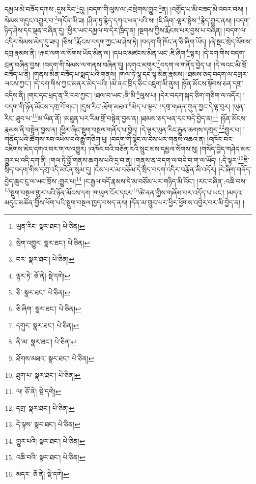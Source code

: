 དམྱལ་མེ་བཟོད་དཀས་:དུས་རིང་\footnote{ཡུན་རིང་  སྣར་ཐང་།  པེ་ཅིན། }དུ། །བདག་གི་ལུས་ལ་:བསྲེགས་གྱུར་\footnote{སྲེག་འགྱུར་  སྣར་ཐང་།  པེ་ཅིན། }ན། །འགྱོད་པ་མི་བཟད་མེ་འབར་བས། །སེམས་གདུང་འགྱུར་བ་\footnote{བར་  སྣར་ཐང་།  པེ་ཅིན། }གདོན་མི་ཟ། །ཤིན་ཏུ་རྙེད་དཀའ་ཕན་པའི་ས། །ཇི་ཞིག་:ལྟར་སྟེས་\footnote{ལྟར་ཏེ་  ཅོ་ནེ།  སྡེ་དགེ། }རྙེད་གྱུར་ནས། །བདག་ཉིད་ཤེས་དང་ལྡན་བཞིན་དུ། །ཕྱིར་ཡང་དམྱལ་བ་དེར་ཁྲིད་ན། །སྔགས་ཀྱིས་རྨོངས་པར་བྱས་པ་བཞིན། །བདག་ལ་འདིར་སེམས་མེད་དུ་ཟད། །ཅིས་\footnote{ཅི་  སྣར་ཐང་།  པེ་ཅིན། }རྨོངས་བདག་ཀྱང་མ་ཤེས་ཏེ། །བདག་གི་ཁོང་ན་ཅི་ཞིག་ཡོད། །ཞེ་སྡང་སྲེད་སོགས་དགྲ་རྣམས་ནི། །རྐང་ལག་ལ་སོགས་ཡོད་མིན་ལ། །དཔའ་མཛངས་མིན་ཡང་:ཇི་ཞིག་\footnote{ཅི་ཞིག་  སྣར་ཐང་།  པེ་ཅིན། }ལྟར། །དེ་དག་གིས་བདག་བྲན་བཞིན་བྱས། །བདག་གི་སེམས་ལ་གནས་བཞིན་དུ། །དགའ་མགུར་\footnote{དགུར་  སྣར་ཐང་།  པེ་ཅིན། }བདག་ལ་གནོད་བྱེད་པ། །དེ་ལའང་མི་ཁྲོ་བཟོད་པ་ནི། །གནས་མིན་བཟོད་པ་སྨད་པའི་གནས། །གལ་ཏེ་ལྷ་དང་ལྷ་མིན་རྣམས། །ཐམས་ཅད་བདག་ལ་དགྲར་ལངས་ཀྱང་། །དེ་དག་གིས་ཀྱང་མནར་མེད་པའི། །མེ་ནང་ཁྲིད་ཅིང་འཇུག་མི་ནུས། །ཉོན་མོངས་སྟོབས་ཅན་དགྲ་འདིས་ནི། །གང་དང་ཕྲད་ན་རི་རབ་ཀྱང་། །ཐལ་བ་ཡང་:ནི་མི་\footnote{ནི་མ་  སྣར་ཐང་།  པེ་ཅིན། }ལུས་པ། །དེར་བདག་སྐད་ཅིག་གཅིག་ལ་འདོར། །བདག་གི་ཉོན་མོངས་དགྲ་བོ་གང་། །དུས་རིང་:ཐོག་མཐའ་\footnote{ཐོགས་མཐའ་  སྣར་ཐང་།  པེ་ཅིན། }མེད་པ་ལྟར། །དགྲ་གཞན་ཀུན་ཀྱང་དེ་ལྟ་བུར། །ཡུན་རིང་:ཐུབ་པ་\footnote{ཐུག་པ་  སྣར་ཐང་།  པེ་ཅིན། }མ་ཡིན་ནོ། །མཐུན་པར་རིམ་གྲོ་བསྟེན་བྱས་ན། །ཐམས་ཅད་ཕན་དང་བདེ་བྱེད་ན།\footnote{ལ།  ཅོ་ནེ།  སྡེ་དགེ། } །ཉོན་མོངས་རྣམས་ནི་བསྟེན་བྱས་ན། །ཕྱིར་ཞིང་སྡུག་བསྔལ་གནོད་པ་བྱེད། །དེ་ལྟར་ཡུན་རིང་རྒྱུན་ཆགས་དགྲར་\footnote{དགྲ་  སྣར་ཐང་།  པེ་ཅིན། }གྱུར་པ། །གནོད་པའི་ཚོགས་རབ་འཕེལ་བའི་རྒྱུ་གཅིག་པུ། །བདག་གི་སྙིང་ལ་ངེས་པར་གནས་འཆའ་ན། །འཁོར་བར་འཇིགས་མེད་དགའ་བར་ག་ལ་འགྱུར། །འཁོར་བའི་བཅོན་རའི་སྲུང་མས་དམྱལ་སོགས་སུ། །གསོད་བྱེད་གཤེད་མར་གྱུར་པ་འདི་དག་ནི། །གལ་ཏེ་བློ་གནས་ཆགས་པའི་དྲ་བ་ན། །གནས་ན་བདག་ལ་བདེ་བ་ག་ལ་ཡོད། །:དེ་ལྟར་\footnote{དེ་ལྟས་  སྣར་ཐང་།  པེ་ཅིན། }ཇི་སྲིད་བདག་གིས་དགྲ་འདི་མངོན་སུམ་དུ། །ངེས་པར་མ་བཅོམ་དེ་སྲིད་བདག་འདིར་བརྩོན་མི་འདོར། །རེ་ཞིག་གནོད་བྱེད་ཆུང་ངུ་ལ་ཡང་ཁྲོས་:གྱུར་པ།\footnote{གྱུར་པའི།  སྣར་ཐང་།  པེ་ཅིན། } །ང་རྒྱལ་བདོ་རྣམས་དེ་མ་བཅོམ་པར་གཉིད་མི་འོང་། །རང་བཞིན་:འཆི་བས་\footnote{འཆི་བའི་  སྣར་ཐང་།  པེ་ཅིན། }སྡུག་བསྔལ་གྱུར་པའི་ཉོན་མོངས་དག །གཡུལ་ངོར་དངར་\footnote{མདར་  ཅོ་ནེ།  སྡེ་དགེ། }ཚེ་ནན་གྱིས་གཞོམ་པར་འདོད་པ་ཡང་། །མདའ་མདུང་མཚོན་གྱིས་ཕོག་པའི་སྡུག་བསྔལ་ཁྱད་བསད་ནས། །དོན་མ་གྲུབ་པར་ཕྱིར་ཕྱོགས་འབྱེར་བར་མི་བྱེད་ན། །
